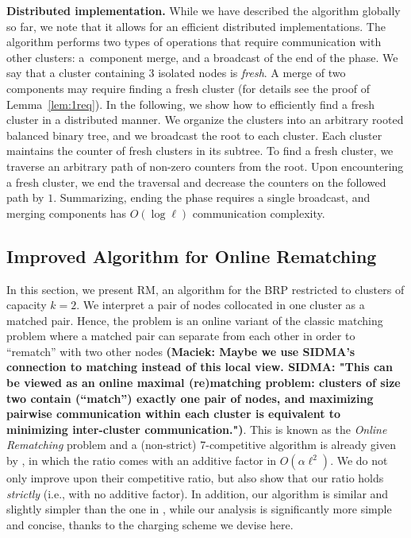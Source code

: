 \documentclass[a4paper,anonymous,USenglish]{lipics-v2019}
\newcommand{\OBRP}{BRP\xspace}
\newcommand{\RM}{\textsc{RM}\xspace} %
\newcommand\maciek[1]{\color{brown}\textbf{(Maciek: #1)}\color{black}}
\begin{document}
\medskip
\noindent
\textbf{Distributed implementation.}
While we have described the algorithm globally so far, we note that it allows for an efficient distributed implementations. 
The algorithm performs two types of operations that require communication with other clusters: a~component merge, and a broadcast of the end of the phase.
We say that a cluster containing $3$ isolated nodes is \emph{fresh}.
A merge of two components may require finding a fresh cluster (for details see the proof of Lemma~\ref{lem:1req}).
In the following, we show how to efficiently find a fresh cluster in a distributed manner.
We organize the clusters into an arbitrary rooted balanced binary tree, and we broadcast the root to each cluster.
Each cluster maintains the counter of fresh clusters in its subtree.
To find a fresh cluster, we traverse an arbitrary path of non-zero counters from the root.
Upon encountering a fresh cluster, we end the traversal and decrease the counters on the followed path by $1$.
Summarizing, ending the phase requires a single broadcast, and merging components has $O(\log \ell)$ communication complexity.

\subsection{Improved Algorithm for Online Rematching} \label{sec:k2}
In this section,
we present \RM,
 an algorithm for the \OBRP restricted to clusters of capacity $k=2$.
We interpret a pair of nodes collocated in one cluster as a matched pair.
Hence,
the problem is an online variant of the classic matching problem where
a matched pair can separate from each other in order to ``rematch'' with two other nodes
\maciek{Maybe we use SIDMA's connection to matching instead of this local view. SIDMA: "This can be viewed as an online maximal (re)matching problem: clusters of size two contain (“match”) exactly one pair of nodes, and maximizing pairwise communication within each cluster is equivalent to minimizing inter-cluster communication."}.
This is known as the  \emph{Online Rematching} 
problem and a (non-strict) 7-competitive algorithm is already given by \cite{repartition-disc},
in which the ratio comes with an additive factor in $O(\alpha\ell^2)$.
We do not only improve upon their competitive ratio,
but also show that our ratio holds \emph{strictly}
(i.e., with no additive factor).
In addition,
our algorithm is similar
and slightly simpler than the one in \cite{repartition-disc}, 
while our analysis is significantly more simple and concise,
thanks to the charging scheme we devise here.
\end{document}
